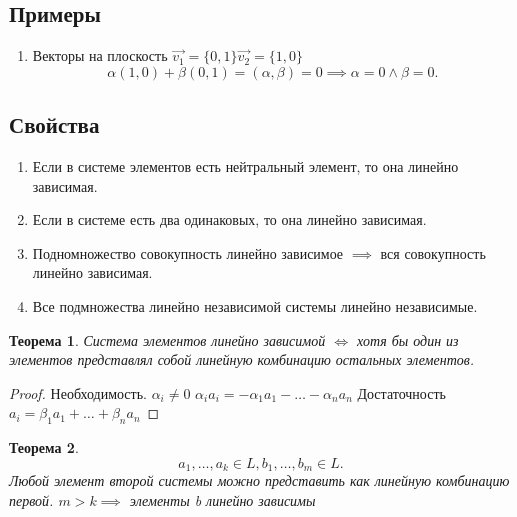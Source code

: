 \documentclass{scrartcl}
\newtheorem{theorem}{Теорема}
\begin{document}
     \subsection{Примеры}
     \begin{enumerate}
         \item Векторы на плоскость $\vec{v_1} = \{0,1\} \vec{v_2} =\{1,0\}$
             \[
             \alpha(1,0) + \beta(0,1) = (\alpha,\beta) = 0 \implies \alpha = 0 \land \beta = 0
             .\] 
     \end{enumerate}
     \subsection{Свойства}
     \begin{enumerate}
         \item Если в системе элементов есть нейтральный элемент, то она линейно зависимая.
        \item Если в системе есть два одинаковых, то она линейно зависимая.
        \item Подномножество совокупность линейно зависимое $\implies$ вся совокупность линейно зависимая.
        \item Все подмножества линейно независимой системы линейно независимые.
     \end{enumerate}
     \begin{theorem}
         Система элементов линейно зависимой $\iff$ хотя бы один из элементов представлял собой линейную комбинацию остальных элементов.
     \end{theorem}
     \begin{proof}
        Необходимость. $\alpha_{i} \neq 0$ $\alpha_{i}a_{i} = -\alpha_1 a_{1} - \dots - \alpha_{n} a_{n}$ 
        Достаточность $a_{i} = \beta_1 a_{1} + \dots + \beta_{n} a_{n}$
     \end{proof}
     \begin{theorem}
         \[
         a_1,\dots,a_{k} \in L, b_1,\dots,b_{m} \in L
         .\] 
         Любой элемент второй системы можно представить как линейную комбинацию первой.
         $m > k \implies $ элементы b линейно зависимы
     \end{theorem}
\end{document}
